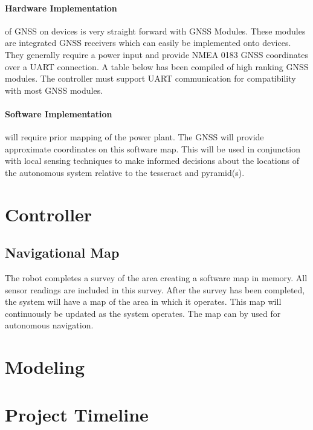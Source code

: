 \documentclass[12pt]{article}
\begin{document}
\paragraph{Hardware Implementation} of GNSS on devices is very straight forward with GNSS Modules. These modules are integrated GNSS receivers which can easily be implemented onto devices. They generally require a power input and provide NMEA 0183 GNSS coordinates over a UART connection. A table below has been compiled of high ranking GNSS modules. The controller must support UART communication for compatibility with most GNSS modules.

\paragraph{Software Implementation} will require prior mapping of the power plant. The GNSS will provide approximate coordinates on this software map. This will be used in conjunction with local sensing techniques to make informed decisions about the locations of the autonomous system relative to the tesseract and pyramid(s).


\section{Controller}

\subsection{Navigational Map} The robot completes a survey of the area creating a software map in memory. All sensor readings are included in this survey. After the survey has been completed, the system will have a map of the area in which it operates. This map will continuously be updated as the system operates. The map can by used for autonomous navigation.

\section{Modeling}

\clearpage
\section{Project Timeline}
\end{document}
